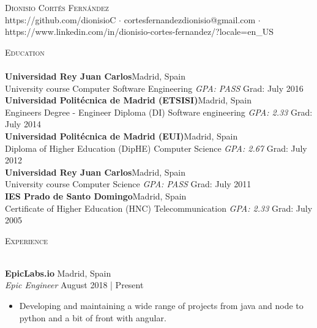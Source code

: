 \documentclass[a4paper]{article}
\newcommand{\lineunder} {
    \vspace*{-8pt} \\
    \hspace*{-18pt} \hrulefill \\
}
\newcommand{\header} [1] {
    {\hspace*{-18pt}\vspace*{6pt} \textsc{#1}}
    \vspace*{-6pt} \lineunder
}
\begin{document}
\vspace*{-40pt}

\vspace*{-10pt}
\begin{center}
	{\Huge \scshape {Dionisio Cort\'es Fern\'andez}}\\
	https://github.com/dionisioC $\cdot$ cortesfernandezdionisio@gmail.com $\cdot$ https://www.linkedin.com/in/dionisio-cortes-fernandez/?locale=en\_US\\
\end{center}

\vspace*{2mm}

\header{Education}
\textbf{Universidad Rey Juan Carlos}\hfill Madrid, Spain\\
University course Computer Software Engineering \textit{GPA: PASS} \hfill Grad: July 2016\\
\vspace{2mm}
\textbf{Universidad Polit\'ecnica de Madrid (ETSISI)}\hfill Madrid, Spain\\
Engineer\textquotesingle s Degree  - Engineer Diploma (DI) Software engineering \textit{GPA: 2.33} \hfill Grad: July 2014\\
\vspace{2mm}
\textbf{Universidad Polit\'ecnica de Madrid (EUI)}\hfill Madrid, Spain\\
Diploma of Higher Education (DipHE) Computer Science \textit{GPA: 2.67} \hfill Grad: July 2012\\
\vspace{2mm}
\textbf{Universidad Rey Juan Carlos}\hfill Madrid, Spain\\
University course Computer Science \textit{GPA: PASS} \hfill Grad: July 2011\\
\vspace{2mm}
\textbf{IES Prado de Santo Domingo}\hfill Madrid, Spain\\
Certificate of Higher Education (HNC) Telecommunication \textit{GPA: 2.33} \hfill Grad: July 2005\\
\vspace{2mm}

\vspace*{2mm}

\header{Experience}
\vspace{1mm}


\textbf{EpicLabs.io} \hfill Madrid, Spain\\
\textit{Epic Engineer} \hfill August 2018 | Present\\
\vspace{-1mm}
\begin{itemize} \itemsep 1pt
    \item Developing and maintaining a wide range of projects from java and node to python and a bit of front with angular.
\end{itemize}
\end{document}

